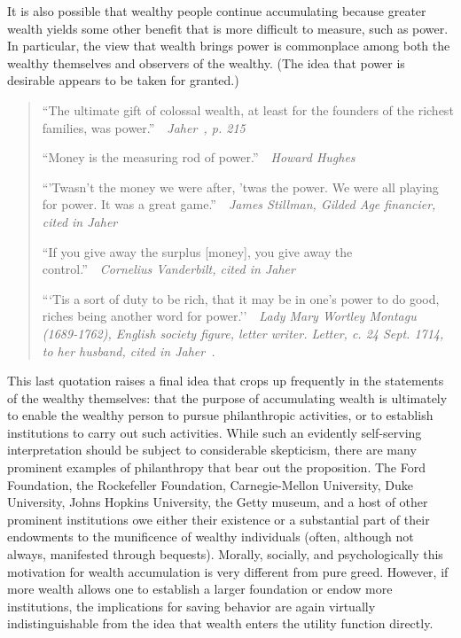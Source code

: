 \documentclass[titlepage,12pt]{article}
\begin{document}
It is also possible that wealthy people continue accumulating because 
greater wealth yields some other benefit that is more difficult to 
measure, such as power.  In particular, the view that wealth 
brings power is commonplace among both the wealthy themselves and 
observers of the wealthy.  (The idea that power is desirable appears 
to be taken for granted.)

\begin{quote}
``The ultimate gift of colossal wealth, at least for the founders of the 
richest families, was power.''~~\emph{Jaher~\cite{jaher:gilded}, p.  215}

``Money is the measuring rod of power.''~~\emph{Howard Hughes}

``'Twasn't the money we were after, 'twas the power.  We were all 
playing for power.  It was a great game.''~~\emph{James Stillman, Gilded 
Age financier, cited in Jaher~\cite{jaher:gilded}}

``If you give away the surplus [money], you give away the 
control.''~~\emph{Cornelius Vanderbilt, cited in 
Jaher~\cite{jaher:gilded}}

```Tis a sort of duty to be rich, that it may be in one's power to do 
good, riches being another word for power.''~~\emph{Lady Mary Wortley 
Montagu (1689-1762), English society figure, letter writer.  Letter, 
c.  24 Sept.  1714, to her husband, cited in Jaher~\cite{jaher:gilded}.}
\end{quote}

This last quotation raises a final idea that crops up frequently in 
the statements of the wealthy themselves: that the purpose of 
accumulating wealth is ultimately to enable the wealthy person to 
pursue philanthropic activities, or to establish institutions to carry 
out such activities.  While such an evidently self-serving 
interpretation should be subject to considerable skepticism, there are 
many prominent examples of philanthropy that bear out the proposition.  
The Ford Foundation, the Rockefeller Foundation, Carnegie-Mellon 
University, Duke University, Johns Hopkins University, the Getty 
museum, and a host of other prominent institutions owe either their 
existence or a substantial part of their endowments to the munificence 
of wealthy individuals (often, although not always, manifested through 
bequests).  Morally, socially, and psychologically this motivation for 
wealth accumulation is very different from pure greed.  However, if 
more wealth allows one to establish a larger foundation or endow more 
institutions, the implications for saving behavior are again virtually 
indistinguishable from the idea that wealth enters the utility 
function directly.
\end{document}
